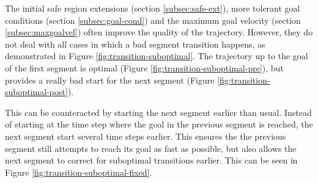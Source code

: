 The initial safe region extensions (section \ref{subsec:safe-ext}), more tolerant goal conditions (section \ref{subsec:goal-cond}) and the maximum goal velocity (section \ref{subsec:maxgoalvel}) often improve the quality of the trajectory. However, they do not deal with all cases in which a bad segment transition happens, as demonstrated in Figure \ref{fig:transition-suboptimal}. The trajectory up to the goal of the first segment is optimal (Figure \ref{fig:transition-suboptimal-pre}), but provides a really bad start for the next segment (Figure \ref{fig:transition-suboptimal-post}). 
\par
This can be counteracted by starting the next segment earlier than usual. Instead of starting at the time step where the goal in the previous segment is reached, the next segment start several time steps earlier. This ensures the the previous segment still attempts to reach its goal as fast as possible, but also allows the next segment to correct for suboptimal transitions earlier. This can be seen in Figure \ref{fig:transition-suboptimal-fixed}.\\


